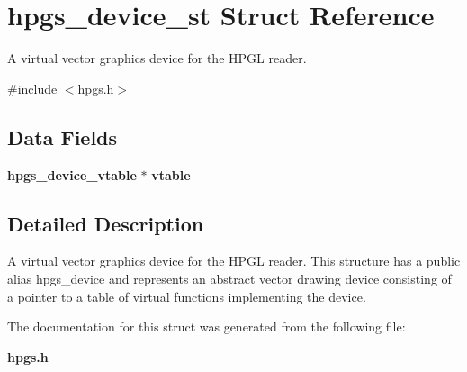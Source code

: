 \section{hpgs\_\-device\_\-st Struct Reference}
\label{structhpgs__device__st}


A virtual vector graphics device for the HPGL reader.  




{\ttfamily \#include $<$hpgs.h$>$}

\subsection*{Data Fields}
\begin{DoxyCompactItemize}
\item 
{\bf hpgs\_\-device\_\-vtable} $\ast$ {\bfseries vtable}\label{structhpgs__device__st_a19dc27125b1aa2d1d6e8bd3325986ba2}

\end{DoxyCompactItemize}


\subsection{Detailed Description}
A virtual vector graphics device for the HPGL reader. This structure has a public alias {\ttfamily hpgs\_\-device} and represents an abstract vector drawing device consisting of a pointer to a table of virtual functions implementing the device. 

The documentation for this struct was generated from the following file:\begin{DoxyCompactItemize}
\item 
{\bf hpgs.h}\end{DoxyCompactItemize}

